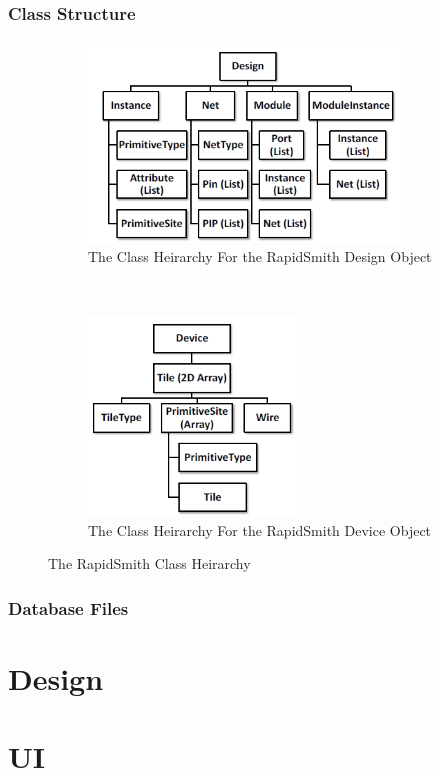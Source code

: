 \subsubsection{Class Structure} \label{sec:classStructure}
\begin{figure}[h]
	\centering
	\begin{subfigure}[t]{0.5\textwidth} \label{fig:rapidSmithDesign}
		\centering
		\includegraphics[height=2.1in]{Figures/rapidSmithDesign}
		\caption{The Class Heirarchy For the RapidSmith Design Object}
	\end{subfigure}%
	~ 
	\begin{subfigure}[t]{0.5\textwidth} \label{fig:rapidSmithDevice}
		\centering
		\includegraphics[height=2.1in]{Figures/rapidSmithDevice}
		\caption{The Class Heirarchy For the RapidSmith Device Object}
	\end{subfigure}
	\caption{The RapidSmith Class Heirarchy~\cite{rapidSmithManual}}
\end{figure}
\subsubsection{Database Files} \label{sec:databaseFiles}
\section{Design}
\section{\acrfull{UI}}